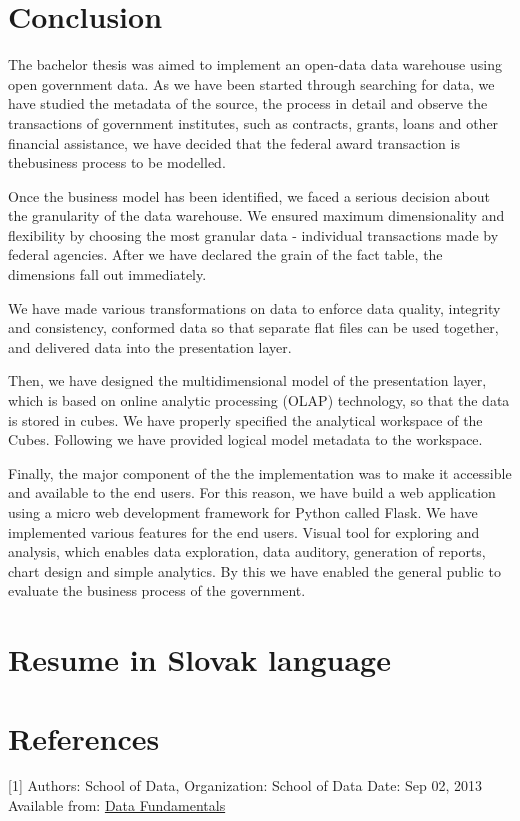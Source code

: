 \documentclass[letterpaper,12pt,oneside]{sphinxmanual}
\begin{document}
\chapter{Conclusion}
\label{conclusion::doc}\label{conclusion:conclusion}
The bachelor thesis was aimed to implement an open-data data warehouse using open government data.
As we have been started through searching for data, we have studied the metadata of the source, the
process in detail and observe the transactions of government institutes, such as contracts, grants,
loans and other financial assistance, we have decided that the federal award transaction is thebusiness process to be modelled.

Once the business model has been identified, we faced a serious decision about the granularity of the data warehouse.
We ensured maximum dimensionality and flexibility by choosing the most granular data - individual transactions made by federal agencies.
After we have declared the grain of the fact table, the dimensions fall out immediately.

We have made various transformations on data to enforce data quality, integrity and consistency, conformed data so
that separate flat files can be used together, and delivered data into the presentation layer.

Then, we have designed the multidimensional model of the presentation layer, which is based on online analytic processing
(OLAP) technology, so that the data is stored in cubes. We have properly specified the analytical workspace of the Cubes.
Following we have provided logical model metadata to the workspace.

Finally, the major component of the the implementation was to make it accessible and available to the end users.
For this reason, we have build a web application using a micro web development framework for Python called Flask.
We have implemented various features for the end users. Visual tool for exploring and analysis, which enables data
exploration, data auditory, generation of reports, chart design and simple analytics. By this we have enabled the
general public to evaluate the business process of the government.


\chapter{Resume in Slovak language}
\label{resume::doc}\label{resume:resume-in-slovak-language}

\chapter{References}
\label{references::doc}\label{references:references}
\label{references:id1}{[}1{]} Authors: School of Data, Organization: School of Data Date: Sep 02, 2013 Available from: \href{http://schoolofdata.org/handbook/courses/what-is-data/}{Data Fundamentals}
\end{document}
